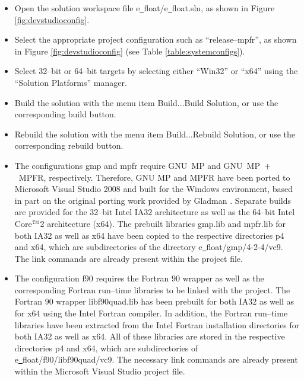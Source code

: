 \begin{itemize}
\item Open the solution workspace file
{\courier e\underline\ float/e\underline\ float.sln},
as shown in Figure \ref{fig:devstudioconfig}.
\item Select the appropriate project configuration such as
``release--mpfr'', as shown in Figure \ref{fig:devstudioconfig}
(see Table \ref{table:systemconfigs}).
\item Select 32--bit or 64--bit targets by selecting either ``Win32'' or ``x64'' using
the ``Solution Platforms'' manager.
\item Build the solution with the menu item {\courier Build}$\dots${\courier Build Solution},
or use the corresponding build button.
\item Rebuild the solution with the menu item {\courier Build}$\dots${\courier Rebuild Solution},
or use the corresponding rebuild button.
\item The configurations {\courier gmp} and {\courier mpfr} require GNU~MP and GNU~MP~$+$~MPFR,
respectively. Therefore, GNU MP and MPFR have been ported to
Microsoft{\footnotesize {\textregistered}} Visual Studio{\footnotesize {\textregistered}} 2008
and built for the Windows{\footnotesize {\textregistered}} environment,
based in part on the original porting work provided by
Gladman \cite{gladman:ports}. Separate builds are provided for the 32--bit
Intel{\footnotesize {\textregistered}}
IA32 architecture as well as the 64--bit
Intel{\footnotesize {\textregistered}} Core\ensuremath{^{\text{\courier TM}}}2
architecture (x64). The pre\-built libraries {\courier gmp}.{\courier lib} and {\courier mpfr}.{\courier lib}
for both IA32 as well as x64 have been copied to the respective directories
{\courier p4} and {\courier x64}, which  are subdirectories of the directory
{\courier e\underline\ float/gmp/4-2-4/vc9}. The link commands are already
present within the project file.
\item The configuration {\courier f90} requires the Fortran $90$ wrapper as well as the
corresponding Fortran run--time libraries to be linked with the project.
The Fortran $90$ wrapper {\courier libf90quad}.{\courier lib} has been prebuilt
for both IA32 as well as for x64 using the Intel{\footnotesize {\textregistered}}
Fortran compiler. In addition, the Fortran run--time libraries have been extracted from the
Intel{\footnotesize {\textregistered}} Fortran installation directories for both
IA32 as well as x64.
All of these libraries are stored in the respective directories
{\courier p4} and {\courier x64}, which  are subdirectories of
{\courier e\underline\ float/}{\courier f90/libf90quad/vc9}.
The necessary link commands are already present within the
Microsoft{\footnotesize {\textregistered}} Visual Studio{\footnotesize {\textregistered}}
project file.
\end{itemize}


